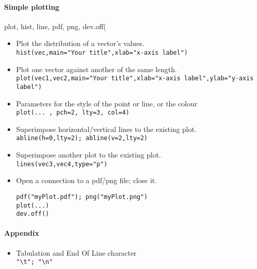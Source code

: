 \documentclass[a4paper,11pt]{article}
\begin{document}
\paragraph{Simple plotting} plot, hist, line, pdf, png, dev.off(
\begin{itemize} 
  \item Plot the distribution of a vector's values. \\ 
    \verb!hist(vec,main="Your title",xlab="x-axis label")!
  \item Plot one vector against another of the same length. \\ 
    \verb!plot(vec1,vec2,main="Your title",xlab="x-axis label",ylab="y-axis label")!
  \item Parameters for the style of the point or line, or the colour \\ 
    \verb!plot(... , pch=2, lty=3, col=4)!
  \item Superimpose horizontal/vertical lines to the existing plot. \\ 
    \verb!abline(h=0,lty=2); abline(v=2,lty=2)!
  \item Superimpose another plot to the existing plot. \\ 
    \verb!lines(vec3,vec4,type="p")!
  \item Open a connection to a pdf/png file; close it.
\begin{verbatim}
pdf("myPlot.pdf"); png("myPlot.png")
plot(...)
dev.off()
\end{verbatim}
\end{itemize}

\paragraph{Appendix}
\begin{itemize} 
  \item Tabulation and End Of Line character \\ 
    \verb!"\t"; "\n"!
\end{itemize}
\end{document}
